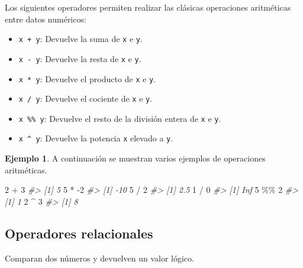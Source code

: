 \documentclass[
]{book}
\newenvironment{Shaded}{\begin{snugshade}}{\end{snugshade}}
\newcommand{\CommentTok}[1]{\textcolor[rgb]{0.56,0.35,0.01}{\textit{#1}}}
\newcommand{\DecValTok}[1]{\textcolor[rgb]{0.00,0.00,0.81}{#1}}
\newcommand{\SpecialCharTok}[1]{\textcolor[rgb]{0.00,0.00,0.00}{#1}}
\providecommand{\tightlist}{%
  \setlength{\itemsep}{0pt}\setlength{\parskip}{0pt}}
\theoremstyle{definition}
\theoremstyle{definition}
\newtheorem{example}{Ejemplo}[chapter]
\theoremstyle{definition}
\theoremstyle{definition}
\theoremstyle{remark}
\begin{document}
Los siguientes operadores permiten realizar las clásicas operaciones aritméticas entre datos numéricos:

\begin{itemize}
\tightlist
\item
  \texttt{x\ +\ y}: Devuelve la suma de \texttt{x} e \texttt{y}.
\item
  \texttt{x\ -\ y}: Devuelve la resta de \texttt{x} e \texttt{y}.
\item
  \texttt{x\ *\ y}: Devuelve el producto de \texttt{x} e \texttt{y}.
\item
  \texttt{x\ /\ y}: Devuelve el cociente de \texttt{x} e \texttt{y}.\\
\item
  \texttt{x\ \%\%\ y}: Devuelve el resto de la división entera de \texttt{x} e \texttt{y}.\\
\item
  \texttt{x\ \^{}\ y}: Devuelve la potencia \texttt{x} elevado a \texttt{y}.
\end{itemize}

\begin{example}

A continuación se muestran varios ejemplos de operaciones aritméticas.

\begin{Shaded}
\begin{Highlighting}[]
\DecValTok{2} \SpecialCharTok{+} \DecValTok{3}
\CommentTok{\#\textgreater{} [1] 5}
\DecValTok{5} \SpecialCharTok{*} \SpecialCharTok{{-}}\DecValTok{2}
\CommentTok{\#\textgreater{} [1] {-}10}
\DecValTok{5} \SpecialCharTok{/} \DecValTok{2}
\CommentTok{\#\textgreater{} [1] 2.5}
\DecValTok{1} \SpecialCharTok{/} \DecValTok{0}
\CommentTok{\#\textgreater{} [1] Inf}
\DecValTok{5} \SpecialCharTok{\%\%} \DecValTok{2}
\CommentTok{\#\textgreater{} [1] 1}
\DecValTok{2} \SpecialCharTok{\^{}} \DecValTok{3}
\CommentTok{\#\textgreater{} [1] 8}
\end{Highlighting}
\end{Shaded}

\end{example}

\hypertarget{operadores-relacionales}{%
\subsection{Operadores relacionales}\label{operadores-relacionales}}

Comparan dos números y devuelven un valor lógico.
\end{document}
